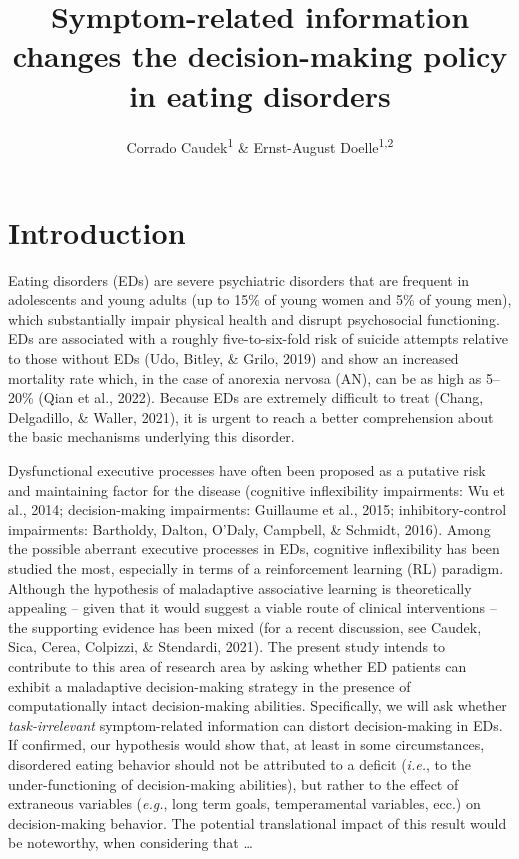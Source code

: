 \documentclass[
  man,floatsintext]{apa6}
\title{Symptom-related information changes the decision-making policy in eating disorders}
\author{Corrado Caudek\textsuperscript{1} \& Ernst-August Doelle\textsuperscript{1,2}}
\date{}
\affiliation{\vspace{0.5cm}\textsuperscript{1} Wilhelm-Wundt-University\\\textsuperscript{2} Konstanz Business School}
\begin{document}
\maketitle

\hypertarget{introduction}{%
\section{Introduction}\label{introduction}}

Eating disorders (EDs) are severe psychiatric disorders that are frequent in adolescents and young adults (up to 15\% of young women and 5\% of young men), which substantially impair physical health and disrupt psychosocial functioning. EDs are associated with a roughly five-to-six-fold risk of suicide attempts relative to those without EDs (Udo, Bitley, \& Grilo, 2019) and show an increased mortality rate which, in the case of anorexia nervosa (AN), can be as high as 5--20\% (Qian et al., 2022). Because EDs are extremely difficult to treat (Chang, Delgadillo, \& Waller, 2021), it is urgent to reach a better comprehension about the basic mechanisms underlying this disorder.

Dysfunctional executive processes have often been proposed as a putative risk and maintaining factor for the disease (cognitive inflexibility impairments: Wu et al., 2014; decision-making impairments: Guillaume et al., 2015; inhibitory-control impairments: Bartholdy, Dalton, O'Daly, Campbell, \& Schmidt, 2016). Among the possible aberrant executive processes in EDs, cognitive inflexibility has been studied the most, especially in terms of a reinforcement learning (RL) paradigm. Although the hypothesis of maladaptive associative learning is theoretically appealing -- given that it would suggest a viable route of clinical interventions -- the supporting evidence has been mixed (for a recent discussion, see Caudek, Sica, Cerea, Colpizzi, \& Stendardi, 2021). The present study intends to contribute to this area of research area by asking whether ED patients can exhibit a maladaptive decision-making strategy in the presence of computationally intact decision-making abilities. Specifically, we will ask whether \emph{task-irrelevant} symptom-related information can distort decision-making in EDs. If confirmed, our hypothesis would show that, at least in some circumstances, disordered eating behavior should not be attributed to a deficit (\emph{i.e.}, to the under-functioning of decision-making abilities), but rather to the effect of extraneous variables (\emph{e.g.}, long term goals, temperamental variables, ecc.) on decision-making behavior. The potential translational impact of this result would be noteworthy, when considering that \ldots{}
\end{document}
